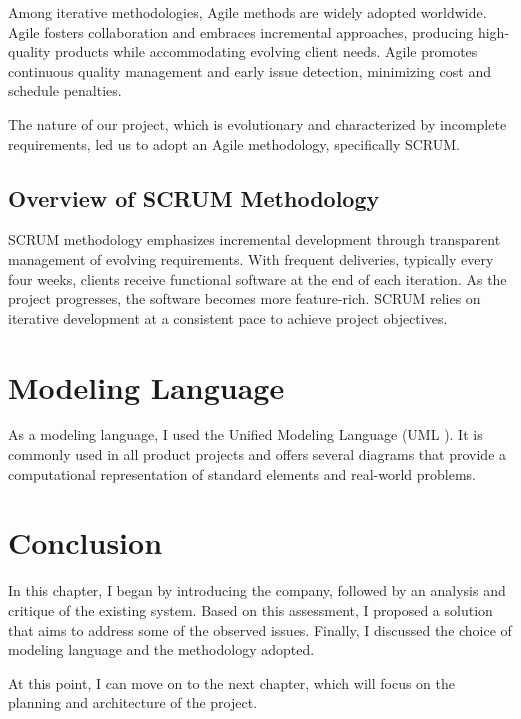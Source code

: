 Among iterative methodologies, Agile \cite{agile} methods are widely adopted worldwide. Agile fosters collaboration and embraces incremental approaches, producing high-quality products while accommodating evolving client needs. Agile promotes continuous quality management and early issue detection, minimizing cost and schedule penalties.

The nature of our project, which is evolutionary and characterized by incomplete requirements, led us to adopt an Agile methodology, specifically SCRUM.

\subsection{Overview of SCRUM Methodology}


SCRUM \cite{scrum} methodology emphasizes incremental development through transparent management of evolving requirements. With frequent deliveries, typically every four weeks, clients receive functional software at the end of each iteration. As the project progresses, the software becomes more feature-rich. SCRUM relies on iterative development at a consistent pace to achieve project objectives.


\section{Modeling Language}


As a modeling language, I used the Unified Modeling Language (UML \cite{uml}). It is commonly used in all product projects and offers several diagrams that provide a computational representation of standard elements and real-world problems.


\section*{Conclusion}

In this chapter, I began by introducing the company, followed by an analysis and critique of the existing system. Based on this assessment, I proposed a solution that aims to address some of the observed issues. Finally, I discussed the choice of modeling language and the methodology adopted.

At this point, I can move on to the next chapter, which will focus on the planning and architecture of the project.
